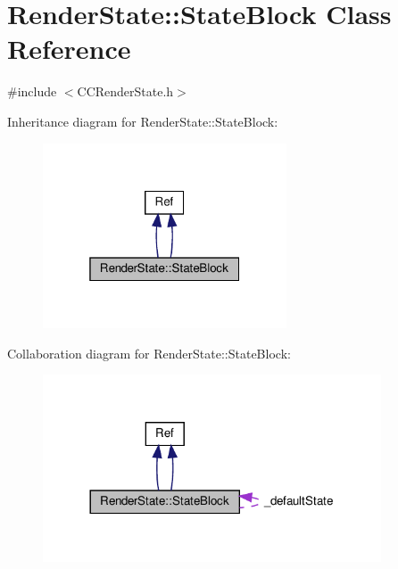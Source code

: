 \hypertarget{classRenderState_1_1StateBlock}{}\section{Render\+State\+:\+:State\+Block Class Reference}
\label{classRenderState_1_1StateBlock}


{\ttfamily \#include $<$C\+C\+Render\+State.\+h$>$}



Inheritance diagram for Render\+State\+:\+:State\+Block\+:
\nopagebreak
\begin{figure}[H]
\begin{center}
\leavevmode
\includegraphics[width=205pt]{classRenderState_1_1StateBlock__inherit__graph}
\end{center}
\end{figure}


Collaboration diagram for Render\+State\+:\+:State\+Block\+:
\nopagebreak
\begin{figure}[H]
\begin{center}
\leavevmode
\includegraphics[width=284pt]{classRenderState_1_1StateBlock__coll__graph}
\end{center}
\end{figure}
